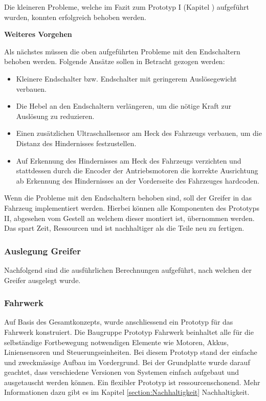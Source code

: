 Die kleineren Probleme, welche im Fazit zum Prototyp I (Kapitel ) aufgeführt wurden, konnten erfolgreich behoben werden.

\textbf{Weiteres Vorgehen}

Als nächstes müssen die oben aufgeführten Probleme mit den Endschaltern behoben werden. Folgende Ansätze sollen in Betracht gezogen werden:
\begin{itemize}
    \item Kleinere Endschalter bzw. Endschalter mit geringerem Auslösegewicht verbauen.
    \item Die Hebel an den Endschaltern verlängeren, um die nötige Kraft zur Auslösung zu reduzieren.
    \item Einen zusätzlichen Ultraschallsensor am Heck des Fahrzeugs verbauen, um die Distanz des Hindernisses festzustellen.
    \item Auf Erkennung des Hindernisses am Heck des Fahrzeugs verzichten und stattdessen durch die Encoder der Antriebsmotoren die korrekte Ausrichtung ab Erkennung des Hindernisses an der Vorderseite des Fahrzeuges hardcoden.
\end{itemize}

Wenn die Probleme mit den Endschaltern behoben sind, soll der Greifer in das Fahrzeug implementiert werden. Hierbei können alle Komponenten des Prototyps II, abgesehen vom Gestell an welchem dieser montiert ist, übernommen werden. Das spart Zeit, Ressourcen und ist nachhaltiger als die Teile neu zu fertigen.


\subsubsection*{Auslegung Greifer}
\label{subsubsection:gripper-calculations}


Nachfolgend sind die ausführlichen Berechnungen aufgeführt, nach welchen der Greifer ausgelegt wurde.



\subsubsection*{Fahrwerk}


Auf Basis des Gesamtkonzepts, wurde anschliessend ein Prototyp für das Fahrwerk konstruiert. Die Baugruppe Prototyp Fahrwerk beinhaltet alle für die selbständige Fortbewegung notwendigen Elemente wie Motoren, Akkus, Liniensensoren und Steuerungseinheiten. Bei diesem Prototyp stand der einfache und zweckmässige Aufbau im Vordergrund. Bei der Grundplatte wurde darauf geachtet, dass verschiedene  Versionen von Systemen einfach aufgebaut und ausgetauscht werden können. Ein flexibler Prototyp ist ressourcenschonend. Mehr Informationen dazu gibt es im Kapitel \ref{section:Nachhaltigkeit} Nachhaltigkeit. 

